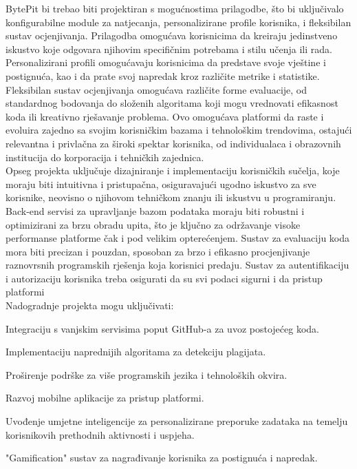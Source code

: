 		BytePit bi trebao biti projektiran s mogućnostima prilagodbe, što bi uključivalo 
		konfigurabilne module za natjecanja, personalizirane profile korisnika, i fleksibilan 
		sustav ocjenjivanja. Prilagodba omogućava korisnicima da kreiraju jedinstveno 
		iskustvo koje odgovara njihovim specifičnim potrebama i stilu učenja ili rada. 
		Personalizirani profili omogućavaju korisnicima da predstave svoje vještine i 
		postignuća, kao i da prate svoj napredak kroz različite metrike i statistike. 
		Fleksibilan sustav ocjenjivanja omogućava različite forme evaluacije, od standardnog 
		bodovanja do složenih algoritama koji mogu vrednovati efikasnost koda ili kreativno 
		rješavanje problema. Ovo omogućava platformi da raste i evoluira zajedno sa svojim 
		korisničkim bazama i tehnološkim trendovima, ostajući relevantna i privlačna za 
		široki spektar korisnika, od individualaca i obrazovnih institucija do korporacija 
		i tehničkih zajednica.
		\\

		Opseg projekta uključuje dizajniranje i implementaciju korisničkih sučelja, koje 
		moraju biti intuitivna i pristupačna, osiguravajući ugodno iskustvo za sve korisnike, 
		neovisno o njihovom tehničkom znanju ili iskustvu u programiranju. Back-end servisi 
		za upravljanje bazom podataka moraju biti robustni i optimizirani za brzu obradu 
		upita, što je ključno za održavanje visoke performanse platforme čak i pod velikim 
		opterećenjem. Sustav za evaluaciju koda mora biti precizan i pouzdan, sposoban za 
		brzo i efikasno procjenjivanje raznovrsnih programskih rješenja koja korisnici 
		predaju. Sustav za autentifikaciju i autorizaciju korisnika treba osigurati da su 
		svi podaci sigurni i da pristup platformi
		\\

		Nadogradnje projekta mogu uključivati:
		\begin{packed_item}
			\item Integraciju s vanjskim servisima poput GitHub-a za uvoz postojećeg koda.
			\item Implementaciju naprednijih algoritama za detekciju plagijata.
			\item Proširenje podrške za više programskih jezika i tehnoloških okvira.
			\item Razvoj mobilne aplikacije za pristup platformi.
			\item Uvođenje umjetne inteligencije za personalizirane preporuke zadataka
			na temelju korisnikovih prethodnih aktivnosti i uspjeha.
			\item "Gamification" sustav za nagrađivanje korisnika za postignuća i napredak.
		\end{packed_item}


